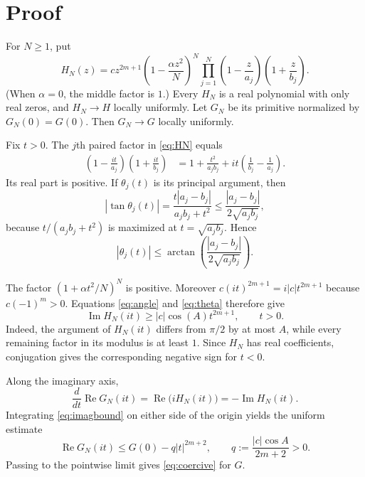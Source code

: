 \documentclass[11pt]{article}
\begin{document}
\section{Proof}

For $N\ge1$, put
\begin{equation}\label{eq:HN}
 H_N(z)=c z^{2m+1}\left(1-\frac{\alpha z^2}{N}\right)^N
 \prod_{j=1}^{N}\left(1-\frac{z}{a_j}\right)
                    \left(1+\frac{z}{b_j}\right).
\end{equation}
(When $\alpha=0$, the middle factor is $1$.)  Every $H_N$ is a real
polynomial with only real zeros, and $H_N\to H$ locally uniformly.  Let $G_N$
be its primitive normalized by $G_N(0)=G(0)$.  Then $G_N\to G$ locally
uniformly.

Fix $t>0$.  The $j$th paired factor in \eqref{eq:HN} equals
\begin{align*}
 \left(1-\frac{it}{a_j}\right)\left(1+\frac{it}{b_j}\right)
 &=1+\frac{t^2}{a_jb_j}
   +it\left(\frac1{b_j}-\frac1{a_j}\right).
\end{align*}
Its real part is positive.  If $\theta_j(t)$ is its principal argument, then
\[
 |\tan\theta_j(t)|
 =\frac{t|a_j-b_j|}{a_jb_j+t^2}
 \le\frac{|a_j-b_j|}{2\sqrt{a_jb_j}},
\]
because $t/(a_jb_j+t^2)$ is maximized at $t=\sqrt{a_jb_j}$.  Hence
\begin{equation}\label{eq:theta}
 |\theta_j(t)|\le
 \arctan\!\left(\frac{|a_j-b_j|}{2\sqrt{a_jb_j}}\right).
\end{equation}

The factor $(1+\alpha t^2/N)^N$ is positive.  Moreover
$c(it)^{2m+1}=i|c|t^{2m+1}$ because $c(-1)^m>0$.  Equations
\eqref{eq:angle} and \eqref{eq:theta} therefore give
\begin{equation}\label{eq:imagbound}
 \operatorname{Im}H_N(it)
 \ge |c|\cos(A)t^{2m+1},\qquad t>0.
\end{equation}
Indeed, the argument of $H_N(it)$ differs from $\pi/2$ by at most $A$, while
every remaining factor in its modulus is at least $1$.  Since $H_N$ has real
coefficients, conjugation gives the corresponding negative sign for $t<0$.

Along the imaginary axis,
\[
 \frac{d}{dt}\operatorname{Re}G_N(it)
 =\operatorname{Re}\bigl(iH_N(it)\bigr)
 =-\operatorname{Im}H_N(it).
\]
Integrating \eqref{eq:imagbound} on either side of the origin yields the
uniform estimate
\begin{equation}\label{eq:GNbound}
 \operatorname{Re}G_N(it)
 \le G(0)-q|t|^{2m+2},
 \qquad q:=\frac{|c|\cos A}{2m+2}>0.
\end{equation}
Passing to the pointwise limit gives \eqref{eq:coercive} for $G$.
\end{document}
